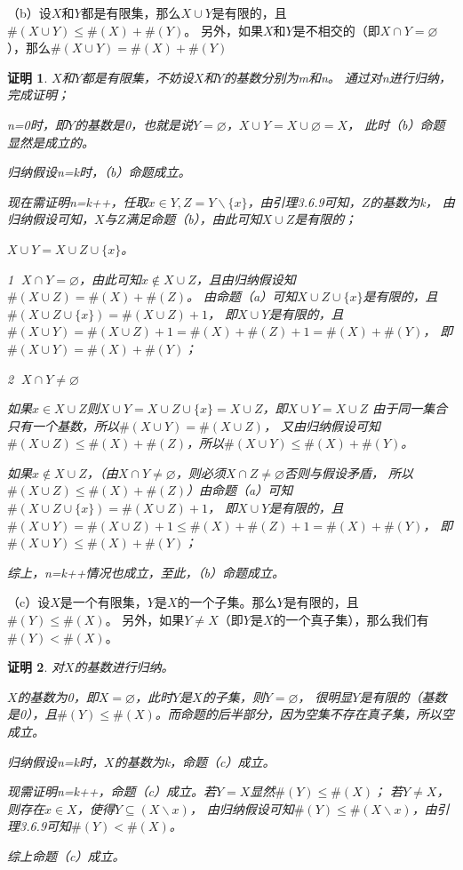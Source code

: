 \documentclass{article}
\theoremstyle{mystyle}
\theoremstyle{zproofstyle}
\newtheorem*{zproof}{证明}
\begin{document}
（b）设$X$和$Y$都是有限集，那么$X \cup Y$是有限的，且$\# (X \cup Y) \leq \# (X) + \# (Y)$。
另外，如果$X$和$Y$是不相交的（即$X \cap Y = \varnothing$），那么$\# (X \cup Y) = \# (X) + \# (Y)$
\begin{zproof}
  $X$和$Y$都是有限集，不妨设$X$和$Y$的基数分别为m和n。
  通过对n进行归纳，完成证明；

  n=0时，即$Y$的基数是0，也就是说$Y = \varnothing$，$X \cup Y = X \cup \varnothing = X$，
  此时（b）命题显然是成立的。

  归纳假设n=k时，（b）命题成立。 

  现在需证明n=k++，任取$x \in Y, Z=Y \backslash \{x\}$，由引理3.6.9可知，$Z$的基数为k，
  由归纳假设可知，$X$与$Z$满足命题（b），由此可知$X \cup Z$是有限的；

  $X \cup Y = X \cup Z \cup \{x\}$。

  \textcircled{1} $X \cap Y = \varnothing$，由此可知$x \not\in X \cup Z$，且由归纳假设知$\#(X \cup Z) = \#(X)+\#(Z)$。
  由命题（a）可知$X \cup Z \cup \{x\}$是有限的，且$\#(X \cup Z \cup \{x\})=\#(X \cup Z)+1$，
  即$X \cup Y$是有限的，且$\#(X \cup Y) = \#(X \cup Z)+1 = \#(X) + \#(Z) + 1 = \#(X) + \#(Y)$，
  即$\#(X \cup Y) = \#(X) + \#(Y)$；

  \textcircled{2} $X \cap Y \neq \varnothing$

  如果$x \in X \cup Z$则$X \cup Y=X \cup Z \cup \{x\}=X \cup Z$，即$X \cup Y=X \cup Z$
  由于同一集合只有一个基数，所以$\#(X \cup Y)=\#(X \cup Z)$，
  又由归纳假设可知 $\#(X \cup Z) \leq \#(X) + \#(Z)$，所以$\#(X \cup Y) \leq \#(X)+ \#(Y)$。

  如果$x \not\in X \cup Z$，（由$X \cap Y \neq \varnothing$，则必须$X \cap Z \neq \varnothing$否则与假设矛盾，
  所以$\#(X \cup Z) \leq \#(X) + \#(Z)$）由命题（a）可知$\#(X \cup Z \cup \{x\})=\#(X \cup Z)+1$，
  即$X \cup Y$是有限的，且$\#(X \cup Y) = \#(X \cup Z)+1 \leq \#(X) + \#(Z) + 1 = \#(X) + \#(Y)$，
  即$\#(X \cup Y) \leq \#(X) + \#(Y)$；

  综上，n=k++情况也成立，至此，（b）命题成立。
\end{zproof}

（c）设$X$是一个有限集，$Y$是$X$的一个子集。那么$Y$是有限的，且$\# (Y) \leq \# (X)$。
另外，如果$Y \neq X$（即$Y$是$X$的一个真子集），那么我们有$\#(Y) < \#(X)$。

\begin{zproof}
  对$X$的基数进行归纳。

  $X$的基数为0，即$X = \varnothing$，此时$Y$是$X$的子集，则$Y = \varnothing$，
  很明显$Y$是有限的（基数是0），且$\# (Y) \leq \# (X)$。而命题的后半部分，因为空集不存在真子集，所以空成立。

  归纳假设n=k时，$X$的基数为k，命题（c）成立。

  现需证明n=k++，命题（c）成立。若$Y=X$显然$\#(Y) \leq \#(X)$；
  若$Y \neq X$，则存在$x \in X$，使得$Y \subseteq (X \backslash {x})$，
  由归纳假设可知$\#(Y) \leq \#(X \backslash x)$，由引理3.6.9可知$\#(Y) < \#(X)$。

  综上命题（c）成立。
\end{zproof}
\end{document}
